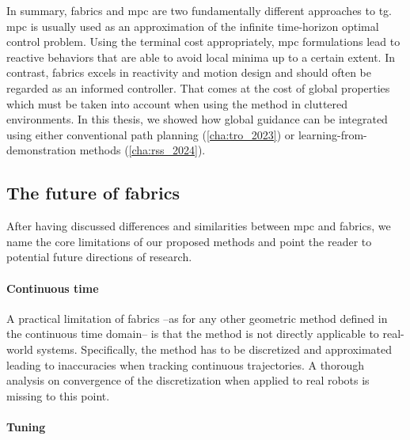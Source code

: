 In summary, \ac{fabrics} and \ac{mpc} are two fundamentally
different approaches to \ac{tg}. \Ac{mpc} is usually used as
an approximation of the infinite time-horizon optimal
control problem. Using the terminal cost appropriately,
\ac{mpc} formulations lead to reactive behaviors that are
able to avoid local minima up to a certain extent. In
contrast, \ac{fabrics} excels in reactivity and motion
design and should often be regarded as an informed
controller. That comes at the cost of global properties
which must be taken into account when using the method in
cluttered environments. In this thesis, we showed how global
guidance can be integrated using either conventional
path planning (\cref{cha:tro_2023}) or learning-from-demonstration methods (\cref{cha:rss_2024}).

\subsection{The future of \ac{fabrics}}
\label{sec:discussion_limitations_of_fabrics}

After having discussed differences and similarities between
\ac{mpc} and \ac{fabrics}, we name the core limitations of
our proposed methods and point the reader to potential
future directions of research. 
\paragraph{Continuous time}
\label{par:discussion_continuous_time}

A practical limitation of \ac{fabrics} --as for any other
geometric method defined in the continuous time domain--
is that the method is not directly applicable to real-world
systems. Specifically, the method has to be discretized and
approximated leading to inaccuracies when tracking continuous
trajectories. A thorough analysis on convergence of the discretization
when applied to real robots is missing to this point.

\paragraph{Tuning}
\label{par:discussion_tuning}

